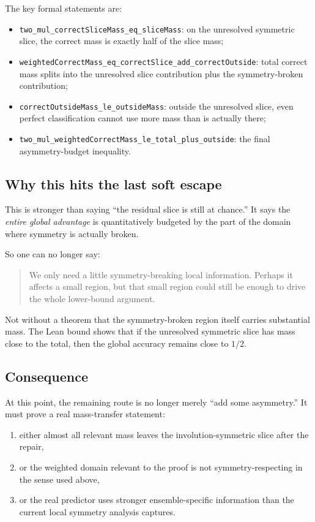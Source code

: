 \documentclass[11pt]{article}
\theoremstyle{remark}
\begin{document}
\noindent
The key formal statements are:
\begin{itemize}[leftmargin=1.5em]
  \item \texttt{two\_mul\_correctSliceMass\_eq\_sliceMass}: on the unresolved symmetric slice, the
  correct mass is exactly half of the slice mass;
  \item \texttt{weightedCorrectMass\_eq\_correctSlice\_add\_correctOutside}: total correct mass
  splits into the unresolved slice contribution plus the symmetry-broken contribution;
  \item \texttt{correctOutsideMass\_le\_outsideMass}: outside the unresolved slice, even perfect
  classification cannot use more mass than is actually there;
  \item \texttt{two\_mul\_weightedCorrectMass\_le\_total\_plus\_outside}: the final asymmetry-budget
  inequality.
\end{itemize}

\subsection{Why this hits the last soft escape}

This is stronger than saying ``the residual slice is still at chance.''  It says the \emph{entire
global advantage} is quantitatively budgeted by the part of the domain where symmetry is actually
broken.

So one can no longer say:
\begin{quote}
We only need a little symmetry-breaking local information.  Perhaps it affects a small region, but
that small region could still be enough to drive the whole lower-bound argument.
\end{quote}

Not without a theorem that the symmetry-broken region itself carries substantial mass.  The Lean
bound shows that if the unresolved symmetric slice has mass close to the total, then the global
accuracy remains close to \(1/2\).

\subsection{Consequence}

At this point, the remaining route is no longer merely ``add some asymmetry.''  It must prove a
real mass-transfer statement:
\begin{enumerate}[leftmargin=1.5em]
  \item either almost all relevant mass leaves the involution-symmetric slice after the repair,
  \item or the weighted domain relevant to the proof is not symmetry-respecting in the sense used
  above,
  \item or the real predictor uses stronger ensemble-specific information than the current local
  symmetry analysis captures.
\end{enumerate}
\end{document}
